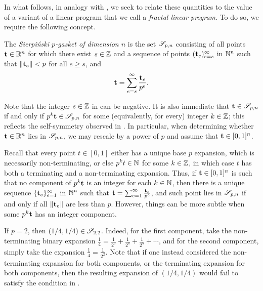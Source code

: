 \documentclass{amsart}
\begin{document}
In what follows, in analogy with , we seek to relate these quantities to the value of a variant of a linear program that we call a \emph{fractal linear program}.  To do so, we require the following concept.

\begin{definition}
\label{sierpinski: D}
   The \emph{Sierpi\'nski $p$-gasket of dimension $n$} is the set $\mathscr{S}_{p,n}$ consisting of all points $\mathbf{t}\in \mathbb{R}^n$ for which there exist $s \in \mathbb{Z}$ and a sequence of points $( \mathbf{t}_e )_{e=s}^\infty$ in $\mathbb{N}^n$ such that $\| \mathbf{t}_e \| < p$ for all $e \geq s$, and
 \[
\mathbf{t} = \sum_{e=s}^{\infty} \frac{\mathbf{t}_e}{p^e}.
 \]
\end{definition}

Note that the integer $s \in \mathbb{Z}$ in  can be negative.
It is also immediate that $\mathbf{t} \in \mathscr{S}_{p,n}$ if and only if $p^k  \mathbf{t} \in \mathscr{S}_{p,n}$ for some (equivalently, for every) integer $k \in \mathbb{Z}$; this reflects the self-symmetry observed in .
In particular, when determining whether $\mathbf{t} \in \mathbb{R}^n$ lies in $\mathscr{S}_{p,n}$, we may rescale by a power of $p$  and assume that $\mathbf{t} \in [0,1]^n$.

Recall that every point $t \in [0,1]$ either has a unique base $p$ expansion, which is necessarily non-terminating, or else $p^k t \in \mathbb{N}$ for some $k \in \mathbb{Z}$, in which case $t$ has both a terminating and a non-terminating expansion.
Thus, if $\mathbf{t} \in [0,1]^n$ is such that no component of $p^k \mathbf{t}$ is an integer for each $k \in \mathbb{N}$, then there is a unique sequence $\{ \mathbf{t}_e \}_{e=1}^{\infty}$ in $ \mathbb{N}^n$ such that $\mathbf{t} = \sum_{e=1}^{\infty} \frac{\mathbf{t}_e}{p^e}$, and such point lies in ${\mathscr{S}}_{p,n}$ if and only if all $\| \mathbf{t}_e \|$ are less than $p$.
However, things can be more subtle when some $p^k \mathbf{t}$ has an integer component.

\begin{example}
If $p=2$, then $(1/4, 1/4) \in \mathscr{S}_{2,2}$.  Indeed, for the first component, take the non-terminating binary expansion $\frac{1}{4} = \frac{1}{2^3} + \frac{1}{2^4} + \frac{1}{2^5} + \cdots$, and for the second component, simply take the expansion $\frac{1}{4} = \frac{1}{2^2}$.  Note that if one instead considered the non-terminating expansion for both components, or the terminating expansion for both components, then the resulting expansion of $(1/4, 1/4)$ would fail to satisfy the condition in .
\end{example}
\end{document}
